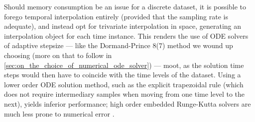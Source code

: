 Should memory consumption be an issue for a discrete dataset, it is possible
to forego temporal interpolation entirely (provided that the sampling rate
is adequate), and instead opt for trivariate interpolation in space, generating
an interpolation object for each time instance. This renders the use of
ODE solvers of adaptive stepsize --- like the Dormand-Prince 8(7) method we
wound up choosing (more on that to follow in
\cref{sec:on_the_choice_of_numerical_ode_solver}) --- moot, as the solution
time steps would then have to coincide with the time levels of the dataset.
Using a lower order ODE solution method, such as the explicit trapezoidal rule
(which does not require intermediary samples when moving from one time level to
the next), yields inferior performance; high order embedded Runge-Kutta solvers
are much less prone to numerical error \parencite{loken2017sensitivity}.



